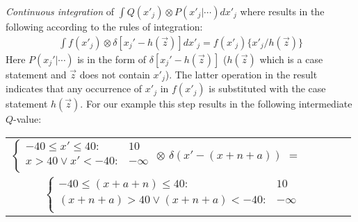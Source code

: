 \begin{itemize}
\emph{Continuous integration} of $\int Q(x'_j) \otimes P(x'_j|\cdots) dx'_j$ where results in the following according to the rules of integration: 
\begin{align}
\int f(x'_j) \otimes \delta[x_j' - h(\vec{z})] dx'_j = f(x'_j) \{ x'_j / h(\vec{z}) \}\nonumber
\end{align}
 Here $P(x_j'|\cdots)$ is in the form of $\delta[x_j' - h(\vec{z})]$ ($h(\vec{z})$ which is a case statement and $\vec{z}$ does not contain $x'_j$). The latter operation in the result indicates that any occurrence of $x'_j$ in $f(x'_j)$ is substituted with the case statement $h(\vec{z})$. For our example this step results in the following intermediate $Q$-value: 
{\footnotesize 
\begin{center}
\begin{tabular}{r c c c l}
\hspace{-6mm} 
$
\begin{cases}
  -40 \leq x' \leq 40: & 10 \\ 
 x>40 \lor x'<-40 : & -\infty \\ 
\end{cases} $
$\otimes$
$ \delta \left( x' - (x+n+a) \right) $
$ = $
\\
  $\begin{cases}
  -40 \leq (x+a+n) \leq 40: & 10 \\ 
 (x+n+a)>40 \lor (x+n+a)<-40 : & -\infty \\ 
  \end{cases}$
\end{tabular}
\end{center}
}
\normalsize


\end{itemize}
